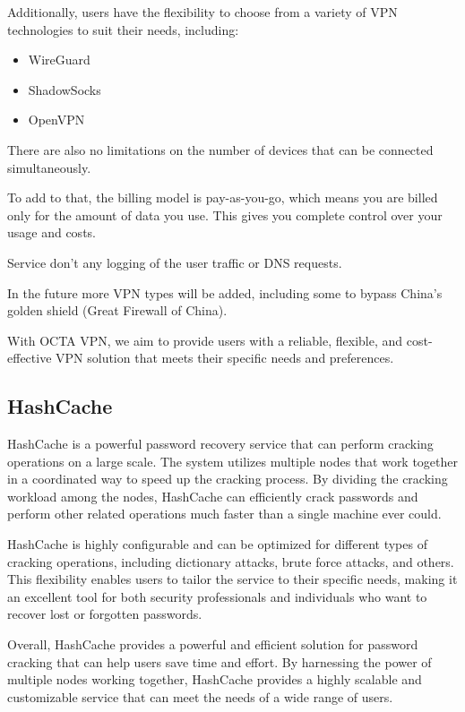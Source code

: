 Additionally, users have the flexibility to choose from a variety of VPN technologies to suit their needs, including:

\begin{itemize}
    \item WireGuard
    \item ShadowSocks
    \item OpenVPN
\end{itemize}

There are also no limitations on the number of devices that can be connected simultaneously.

To add to that, the billing model is pay-as-you-go, which means you are billed only for the amount of data you use.
This gives you complete control over your usage and costs.

Service don’t any logging of the user traffic or DNS requests.

In the future more VPN types will be added, including some to bypass China's golden shield (Great Firewall of China).

With OCTA VPN, we aim to provide users with a reliable, flexible, and cost-effective VPN solution that meets their specific needs and preferences.

\subsection{HashCache}

HashCache is a powerful password recovery service that can perform cracking operations on a large scale. The system utilizes multiple nodes that work together in a coordinated way to speed up the cracking process. By dividing the cracking workload among the nodes, HashCache can efficiently crack passwords and perform other related operations much faster than a single machine ever could.

HashCache is highly configurable and can be optimized for different types of cracking operations, including dictionary attacks, brute force attacks, and others. This flexibility enables users to tailor the service to their specific needs, making it an excellent tool for both security professionals and individuals who want to recover lost or forgotten passwords.

Overall, HashCache provides a powerful and efficient solution for password cracking that can help users save time and effort. By harnessing the power of multiple nodes working together, HashCache provides a highly scalable and customizable service that can meet the needs of a wide range of users.


